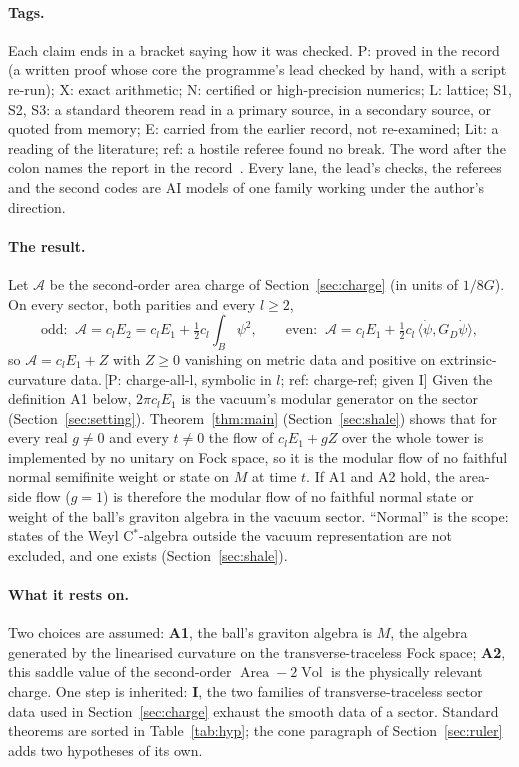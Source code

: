 \documentclass[11pt]{article}
\newcommand{\cA}{\mathcal{A}}
\newcommand{\Area}{\operatorname{Area}}
\newcommand{\Vol}{\operatorname{Vol}}
\newcommand{\GD}{G_{\!D}}
\newcommand{\ip}[2]{\langle #1,#2\rangle}
\newcommand{\ev}[1]{\,{\textsf{\scriptsize[#1]}}}
\begin{document}
\paragraph{Tags.} Each claim ends in a bracket saying how it was checked. \textsf{\small P}: proved in the record (a written proof whose core the programme's lead checked by hand, with a script re-run); \textsf{\small X}: exact arithmetic; \textsf{\small N}: certified or high-precision numerics; \textsf{\small L}: lattice; \textsf{\small S1}, \textsf{\small S2}, \textsf{\small S3}: a standard theorem read in a primary source, in a secondary source, or quoted from memory; \textsf{\small E}: carried from the earlier record, not re-examined; \textsf{\small Lit}: a reading of the literature; \textsf{\small ref}: a hostile referee found no break. The word after the colon names the report in the record~\cite{T}. Every lane, the lead's checks, the referees and the second codes are AI models of one family working under the author's direction.

\paragraph{The result.} Let $\cA$ be the second-order area charge of Section~\ref{sec:charge} (in units of $1/8G$). On every sector, both parities and every $l\ge2$,
\begin{equation}\label{eq:sector}
\text{odd: }\ \cA=c_lE_2=c_lE_1+\tfrac12c_l\!\int_B\psi^2,\qquad
\text{even: }\ \cA=c_lE_1+\tfrac12c_l\,\ip{\dot\psi}{\GD\dot\psi},
\end{equation}
so $\cA=c_lE_1+Z$ with $Z\ge0$ vanishing on metric data and positive on extrinsic-curvature data.\ev{P: charge-all-l, symbolic in $l$; ref: charge-ref; given I} Given the definition A1 below, $2\pi c_lE_1$ is the vacuum's modular generator on the sector (Section~\ref{sec:setting}). Theorem~\ref{thm:main} (Section~\ref{sec:shale}) shows that for every real $g\neq0$ and every $t\neq0$ the flow of $c_lE_1+gZ$ over the whole tower is implemented by no unitary on Fock space, so it is the modular flow of no faithful normal semifinite weight or state on $M$ at time $t$. If A1 and A2 hold, the area-side flow ($g=1$) is therefore the modular flow of no faithful normal state or weight of the ball's graviton algebra in the vacuum sector. ``Normal'' is the scope: states of the Weyl C$^*$-algebra outside the vacuum representation are not excluded, and one exists (Section~\ref{sec:shale}).

\paragraph{What it rests on.} Two choices are assumed: \textbf{A1}, the ball's graviton algebra is $M$, the algebra generated by the linearised curvature on the transverse-traceless Fock space; \textbf{A2}, this saddle value of the second-order $\Area-2\Vol$ is the physically relevant charge. One step is inherited: \textbf{I}, the two families of transverse-traceless sector data used in Section~\ref{sec:charge} exhaust the smooth data of a sector. Standard theorems are sorted in Table~\ref{tab:hyp}; the cone paragraph of Section~\ref{sec:ruler} adds two hypotheses of its own.
\end{document}
